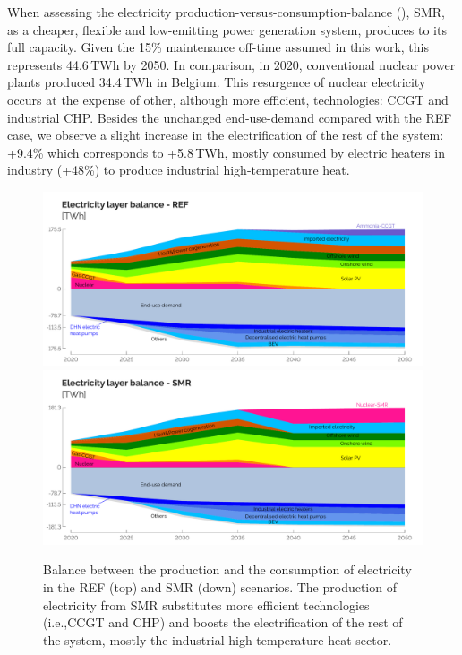 \documentclass[11pt,twoside,a4paper,english]{article}
\def\ie{i.e.,}
\begin{document}
When assessing the electricity production-versus-consumption-balance (), \gls{SMR}, as a cheaper, flexible and low-emitting power generation system, produces to its full capacity. Given the 15\% maintenance off-time assumed in this work, this represents 44.6\,TWh by 2050. In comparison, in 2020, conventional nuclear power plants produced 34.4\,TWh in Belgium. This resurgence of nuclear electricity occurs at the expense of other, although more efficient, technologies: \gls{CCGT} and industrial \gls{CHP}. Besides the unchanged end-use-demand compared with the REF case, we observe a slight increase in the electrification of the rest of the system: +9.4\% which corresponds to +5.8\,TWh, mostly consumed by electric heaters in industry (+48\%) to produce industrial high-temperature heat.

\begin{figure}[t!]
\centering
\includegraphics[width=\textwidth]{Elec_Layer_REF.pdf}
\includegraphics[width=\textwidth]{Elec_Layer_SMR.pdf}
\caption{Balance between the production and the consumption of electricity in the REF (top) and SMR (down) scenarios. The production of electricity from \gls{SMR} substitutes more efficient technologies (\ie \gls{CCGT} and \gls{CHP}) and boosts the electrification of the rest of the system, mostly the industrial high-temperature heat sector.}
\label{fig:results_deter_layer_elec}
\end{figure}
\end{document}
